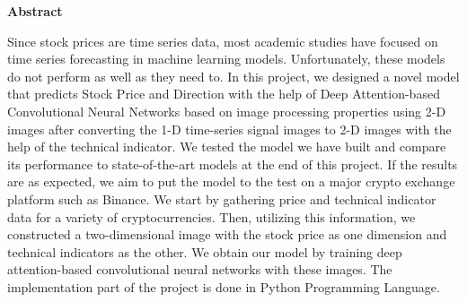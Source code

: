 \documentclass{article}
\begin{document}
\tableofcontents

\maketitle
\begin{center}
    \textbf{\Large Abstract}
\end{center}
Since stock prices are time series data, most academic studies have focused on time series forecasting in machine learning models. Unfortunately, these models do not perform as well as they need to. In this project, we designed a novel model that predicts Stock Price and Direction with the help of Deep Attention-based Convolutional Neural Networks based on image processing properties using 2-D images after converting the 1-D time-series signal images to 2-D images with the help of the technical indicator. We tested the model we have built and compare its performance to state-of-the-art models at the end of this project. If the results are as expected, we aim to put the model to the test on a major crypto exchange platform such as Binance. We start by gathering price and technical indicator data for a variety of cryptocurrencies. Then, utilizing this information, we constructed a two-dimensional image with the stock price as one dimension and technical indicators as the other. We obtain our model by training deep attention-based convolutional neural networks with these images. The implementation part of the project is done in Python Programming Language.
\end{document}
